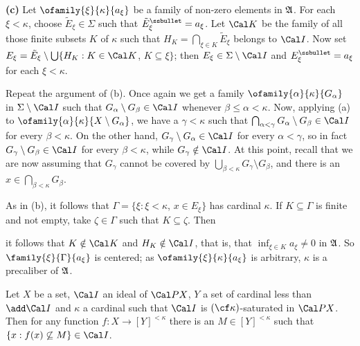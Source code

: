 {\medskip

{\bf (c)} Let $\ofamily{\xi}{\kappa}{a_{\xi}}$ be a family of non-zero
elements in $\frak A$.   For each $\xi<\kappa$, choose
$\tilde E_{\xi}\in\Sigma$ such that
$\tilde E_{\xi}^{\ssbullet}=a_{\xi}$.   Let
$\Cal K$ be the family of all those finite subsets $K$ of $\kappa$ such
that $H_K=\bigcap_{\xi\in K}\tilde E_{\xi}$ belongs to $\Cal I$.
Now set $E_{\xi}
=\tilde E_{\xi}\setminus\bigcup\{H_K:K\in\Cal K$, $K\subseteq\xi\}$;
then $E_{\xi}\in\Sigma\setminus\Cal I$ and $E_{\xi}^{\ssbullet}=a_{\xi}$
for each $\xi<\kappa$.

Repeat the argument of (b).   Once again we get a family
$\ofamily{\alpha}{\kappa}{G_{\alpha}}$ in $\Sigma\setminus\Cal I$ such
that $G_{\alpha}\setminus G_{\beta}\in\Cal I$ whenever
$\beta\le\alpha<\kappa$.   Now, applying (a) to
$\ofamily{\alpha}{\kappa}{X\setminus G_{\alpha}}$, we have a
$\gamma<\kappa$ such that
$\bigcap_{\alpha<\gamma}G_{\alpha}\setminus G_{\beta}\in\Cal I$ for
every $\beta<\kappa$.   On the other hand,
$G_{\gamma}\setminus G_{\alpha}\in\Cal I$ for every $\alpha<\gamma$, so
in fact $G_{\gamma}\setminus G_{\beta}\in\Cal I$ for every
$\beta<\kappa$, while $G_{\gamma}\notin\Cal I$.   At this point, recall
that we are now assuming that $G_{\gamma}$ cannot be covered by
$\bigcup_{\beta<\kappa}G_{\gamma}\setminus G_{\beta}$, and there is an
$x\in\bigcap_{\beta<\kappa}G_{\beta}$.

As in (b), it follows that $\Gamma=\{\xi:\xi<\kappa$, $x\in E_{\xi}\}$
has cardinal $\kappa$.   If $K\subseteq\Gamma$ is finite and not empty,
take $\zeta\in\Gamma$ such that $K\subseteq\zeta$.   Then


\noindent it follows that $K\notin\Cal K$ and $H_K\notin\Cal I$,
that is, that $\inf_{\xi\in K}a_{\xi}\ne 0$ in
$\frak A$.   So $\family{\xi}{\Gamma}{a_{\xi}}$ is centered;  as
$\ofamily{\xi}{\kappa}{a_{\xi}}$ is arbitrary, $\kappa$ is a precaliber
of $\frak A$.
}%

Let $X$ be a set, $\Cal I$ an ideal of $\Cal PX$, $Y$ a set of
cardinal less than $\add\Cal I$ and $\kappa$ a cardinal such that
$\Cal I$ is $(\cf\kappa)$-saturated in $\Cal PX$.   Then for any
function $f:X\to[Y]^{<\kappa}$ there is an
$M\in[Y]^{<\kappa}$ such that $\{x:f(x)\not\subseteq M\}\in\Cal I$.

